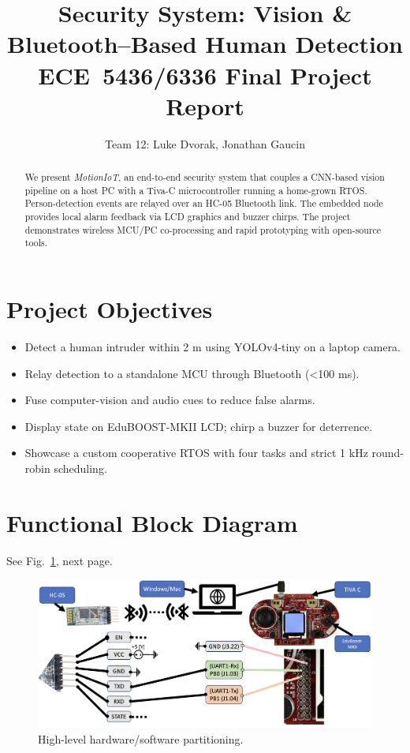 \documentclass[11pt]{IEEEtran}
\title{Security System: Vision \& Bluetooth–Based Human Detection\\
ECE~5436/6336 Final Project Report}
\author{Team 12: Luke Dvorak, Jonathan Gaucin}
\begin{document}
\maketitle

\begin{abstract}
We present \textit{MotionIoT}, an end-to-end security system that couples
a CNN-based vision pipeline on a host PC with a Tiva-C microcontroller
running a home-grown RTOS.  Person-detection events are relayed over an
HC-05 Bluetooth link.  The embedded node provides local alarm feedback
via LCD graphics and buzzer chirps.  The project demonstrates wireless
MCU/PC co-processing and rapid prototyping with open-source tools.
\end{abstract}

\section{Project Objectives}
\begin{itemize}
    \item Detect a human intruder within 2 m using YOLOv4-tiny on a laptop camera.
    \item Relay detection to a standalone MCU through Bluetooth (\textless100 ms).
    \item Fuse computer-vision and audio cues to reduce false alarms.
    \item Display state on EduBOOST-MKII LCD; chirp a buzzer for deterrence.
    \item Showcase a custom cooperative RTOS with four tasks and strict 1 kHz round-robin scheduling.
\end{itemize}

\section{Functional Block Diagram}
See Fig.~\ref{fig:se}, next page.
\begin{figure}[t]
    \centering
    \includegraphics[width=\textwidth]{hardware_diagram.png} %
    \caption{High-level hardware/software partitioning.}
\label{fig:se}
\end{figure}
\end{document}
